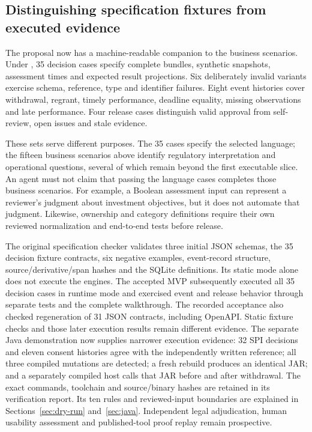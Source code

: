 \subsection{Distinguishing specification fixtures from executed evidence}
\label{merge:P-05-evidence:01}


The proposal now has a machine-readable companion to the business scenarios.
Under , 35 decision cases specify complete bundles,
synthetic snapshots, assessment times and expected result projections. Six
deliberately invalid variants exercise schema, reference, type and identifier
failures. Eight event histories cover withdrawal, regrant, timely performance,
deadline equality, missing observations and late performance. Four release cases
distinguish valid approval from self-review, open issues and stale evidence.

These sets serve different purposes. The 35 cases specify the selected language;
the fifteen business scenarios above identify regulatory interpretation and
operational questions, several of which remain beyond the first executable
slice. An agent must not claim that passing the language cases completes those
business scenarios. For example, a Boolean assessment input can represent a
reviewer's judgment about investment objectives, but it does not automate that
judgment. Likewise, ownership and category definitions require their own reviewed
normalization and end-to-end tests before release.


The original specification checker validates three initial JSON schemas,
the 35 decision fixture contracts, six negative examples, event-record structure,
source/derivative/span hashes and the SQLite definitions. Its static mode alone
does not execute the engines. The accepted MVP subsequently executed all 35
decision cases in runtime mode and exercised event and release behavior through
separate tests and the complete walkthrough. The recorded acceptance also checked
regeneration of 31 JSON contracts, including OpenAPI. Static fixture checks and
those later execution results remain different evidence. The separate Java
demonstration now supplies narrower execution evidence: 32 SPI decisions and eleven
consent histories agree with the independently written reference; all three
compiled mutations are detected; a fresh rebuild produces an identical JAR;
and a separately compiled host calls that JAR before and after withdrawal.
The exact commands, toolchain and source/binary hashes are retained in its
verification report. Its ten rules and reviewed-input boundaries are explained
in Sections~\ref{sec:dry-run} and~\ref{sec:java}. Independent legal adjudication,
human usability assessment and published-tool proof replay remain prospective.

